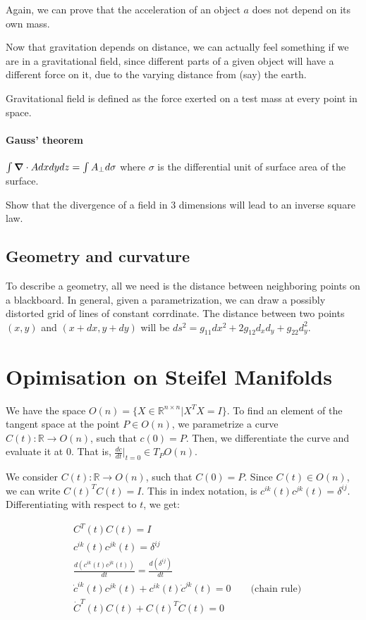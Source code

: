 \documentclass[11pt]{book}
\newcommand{\R}{\ensuremath{\mathbb R}}
\begin{document}
Again, we can prove that the acceleration of an object $a$ does not depend on
its own mass.

Now that gravitation depends on distance, we can actually feel something if we
are in a gravitational field, since different parts of a given object will have
a different force on it, due to the varying distance from (say) the earth.

Gravitational field is defined as the force exerted on a test mass at every
point in space.

\subsubsection{Gauss' theorem}
${\int  \grad \cdot A dx dy dz  = \int A_{\bot} d\sigma}$ where $\sigma$ is the
differential unit of surface area of the surface. 

Show that the divergence of a field in 3 dimensions will lead to an inverse
square law.


\section{Geometry and curvature}

To describe a geometry, all we need is the distance between neighboring points
on a blackboard. In general, given a parametrization, we can draw a possibly
distorted grid of lines of constant corrdinate. The distance between two points
${(x, y)}$ and ${(x + dx, y+ dy)}$ will be ${ds^2 = g_{11} dx^2 + 2 g_{12} d_x d_y + g_{22} d_y^2}$.


\chapter{Opimisation on Steifel Manifolds}
We have the space $O(n) = \{ X \in \R^{n \times n} | X^T X = I \}$. To find an
element of the tangent space at the point $P \in O(n)$, we parametrize a curve
$C(t) : \R \rightarrow O(n)$, such that $c(0) = P$.  Then, we differentiate the
curve and evaluate it at $0$. That is, $\frac{dc}{dt}\vert_{t=0} \in T_P O(n)$.


We consider $C(t) : \R \rightarrow O(n)$, such that $C(0) = P$.  Since $C(t) \in
O(n)$, we can write $C(t)^T C(t) = I$.  This in index notation, is $c^{ik}(t)
c^{jk}(t) = \delta^{ij}$. Differentiating with respect to $t$, we get:

\begin{align*}
&C^T(t) C(t) = I \\
&c^{ik}(t) c^{jk}(t) = \delta^{ij} \\
&\frac{d (c^{ik}(t) c^{jk}(t))}{dt}= \frac{d(\delta^{ij})}{dt} \\
& \dot c^{ik}(t) c^{jk}(t) + c^{ik}(t) \dot c^{jk}(t) = 0 \qquad \text{(chain rule)}\\
&\dot C^T(t) C(t) + C(t)^T \dot C(t) = 0
\end{align*}
\end{document}
